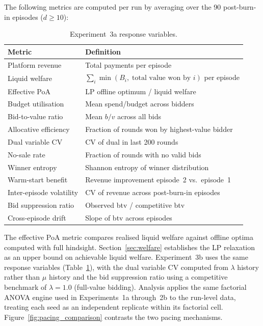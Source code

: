 The following metrics are computed per run by averaging over the 90 post-burn-in episodes ($d \geq 10$):

\begin{table}[H]
\centering
\small
\caption{Experiment~3a response variables.}
\label{tab:exp3a_responses}
\begin{tabular}{ll}
\toprule
\textbf{Metric} & \textbf{Definition} \\
\midrule
Platform revenue       & Total payments per episode \\
Liquid welfare         & $\sum_i \min(B_i,\; \text{total value won by } i)$ per episode \\
Effective PoA          & LP offline optimum / liquid welfare \\
Budget utilisation     & Mean spend/budget across bidders \\
Bid-to-value ratio     & Mean $b/v$ across all bids \\
Allocative efficiency  & Fraction of rounds won by highest-value bidder \\
Dual variable CV       & CV of dual in last 200 rounds \\
No-sale rate           & Fraction of rounds with no valid bids \\
Winner entropy         & Shannon entropy of winner distribution \\
Warm-start benefit     & Revenue improvement episode~2 vs.~episode~1 \\
Inter-episode volatility & CV of revenue across post-burn-in episodes \\
Bid suppression ratio  & Observed btv / competitive btv \\
Cross-episode drift    & Slope of btv across episodes \\
\bottomrule
\end{tabular}
\end{table}

The effective PoA metric compares realised liquid welfare against offline optima computed with full hindsight. Section~\ref{sec:welfare} establishes the LP relaxation as an upper bound on achievable liquid welfare. Experiment~3b uses the same response variables (Table~\ref{tab:exp3a_responses}), with the dual variable CV computed from $\lambda$ history rather than $\mu$ history and the bid suppression ratio using a competitive benchmark of $\lambda = 1.0$ (full-value bidding). Analysis applies the same factorial ANOVA engine used in Experiments~1a through~2b to the run-level data, treating each seed as an independent replicate within its factorial cell. Figure~\ref{fig:pacing_comparison} contrasts the two pacing mechanisms.

